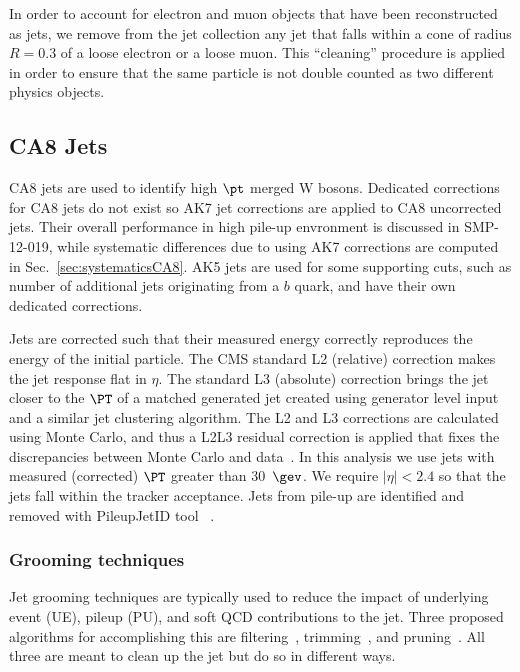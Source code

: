 \par
In order to account for electron and muon objects that
have been reconstructed as jets, we remove from the jet
collection any jet that falls within a
cone of radius $R= 0.3$ of a loose electron or a loose muon. 
This ``cleaning'' procedure is applied in order to ensure that the same
particle is not double counted as two different physics objects.


\subsection{CA8 Jets}
CA8 jets are used to identify high $\pt$ merged W bosons. Dedicated corrections for CA8 jets do not exist so AK7 jet
corrections are applied to CA8 uncorrected jets. Their overall performance in high pile-up envronment is discussed in SMP-12-019, while systematic differences due to using AK7 corrections 
are computed in Sec.~\ref{sec:systematicsCA8}. AK5 jets are used for some supporting cuts, such as number of
additional jets originating from a $b$ quark, and have their own dedicated corrections.

Jets are corrected such that their measured energy
correctly reproduces the energy of the initial particle. 
The CMS standard L2 (relative) correction makes the jet response flat in $\eta$.
The standard L3 (absolute) correction brings the jet closer to the $\PT$ of 
a matched generated jet created using generator level input and a similar 
jet clustering algorithm.
The L2 and L3 corrections are calculated using Monte Carlo, and thus a 
L2L3 residual correction is applied that fixes the discrepancies between 
Monte Carlo and data~\cite{newjes-cms}.
In this analysis we use jets with measured (corrected) $\PT$  
greater than 30~$\gev$. 
We require $|\eta| < 2.4$ so that the jets fall within the
tracker acceptance. Jets from pile-up are identified and removed with PileupJetID tool ~\cite{cite:PileupJetID}.  

\subsubsection{Grooming techniques}

Jet grooming techniques are typically used to reduce the impact of underlying event (UE), pileup (PU), and soft QCD contributions to the jet.  
Three proposed algorithms for accomplishing this are filtering~\cite{Butterworth:2008iy}, trimming~\cite{Krohn:2009th}, and pruning~\cite{Ellis:2009me}.
All three are meant to clean up the jet but do so in different ways.  

